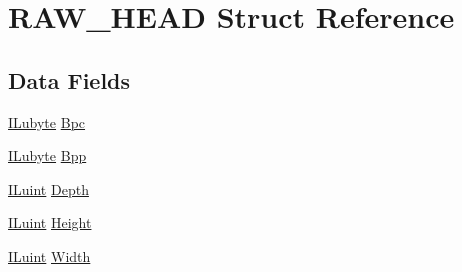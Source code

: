 \hypertarget{struct_r_a_w___h_e_a_d}{\section{R\-A\-W\-\_\-\-H\-E\-A\-D Struct Reference}
\label{struct_r_a_w___h_e_a_d}
}
\subsection*{Data Fields}
\begin{DoxyCompactItemize}
\item 
\hyperlink{il_8h_a8d2f04500100a86d1b00e98ab1b15a33}{I\-Lubyte} \hyperlink{struct_r_a_w___h_e_a_d_a77cd917981bd92ddb76c5108db5993e8}{Bpc}
\item 
\hyperlink{il_8h_a8d2f04500100a86d1b00e98ab1b15a33}{I\-Lubyte} \hyperlink{struct_r_a_w___h_e_a_d_acb619433784a0e26c0f1f18b3700c9f7}{Bpp}
\item 
\hyperlink{il_8h_ac6508d0e9c19e32f32e00d54b5b8cf30}{I\-Luint} \hyperlink{struct_r_a_w___h_e_a_d_a2a4c47a9713bee335a0830b336bdc951}{Depth}
\item 
\hyperlink{il_8h_ac6508d0e9c19e32f32e00d54b5b8cf30}{I\-Luint} \hyperlink{struct_r_a_w___h_e_a_d_a8a8093d76b61a95fc96df24af29b107a}{Height}
\item 
\hyperlink{il_8h_ac6508d0e9c19e32f32e00d54b5b8cf30}{I\-Luint} \hyperlink{struct_r_a_w___h_e_a_d_a4146e7b2b0b4097e0e335f9b348392bf}{Width}
\end{DoxyCompactItemize}


